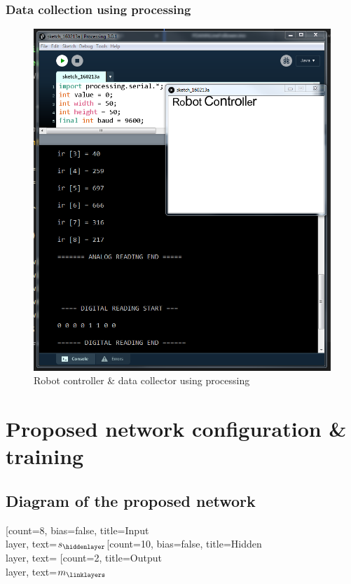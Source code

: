 \documentclass[14pt,a4paper]{extarticle}
\begin{document}
	\subsubsection{Data collection using processing}
	
	\begin{figure}[H]
		\includegraphics[width=\textwidth, scale=.4]{processing.png}
		\caption{Robot controller \& data collector using processing}
	\end{figure}
	
	
	\section{Proposed network configuration \& training}
	
	\subsection{Diagram of the proposed network}
	
	\begin{neuralnetwork}[height=10, layerspacing=6.5cm, nodesize=25pt, nodespacing=1cm, title = {Proposed Feedforward Artificial Neural Network}, layertitleheight  = 0cm]
		\newcommand{\nodetextclear}[2]{}
		\newcommand{\nodetextx}[2]{$s_#2$}
		\newcommand{\nodetexty}[2]{$m_#2$}
		[count=8, bias=false, title=Input\\layer, text=\nodetextx]
		\hiddenlayer[count=10, bias=false, title=Hidden\\layer, text=\nodetextclear] \linklayers
		\outputlayer[count=2, title=Output\\layer, text=\nodetexty] \linklayers
		
		
	
	
	\end{neuralnetwork}
	
\end{document}
